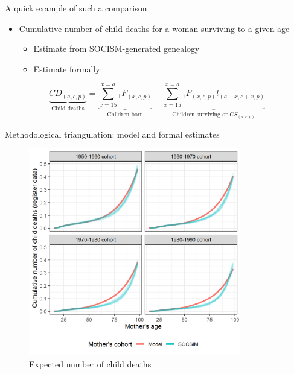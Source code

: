 \documentclass[
  ignorenonframetext,
]{beamer}
\providecommand{\tightlist}{%
  \setlength{\itemsep}{0pt}\setlength{\parskip}{0pt}}
\begin{document}
\begin{frame}{A quick example of such a comparison}
\protect\hypertarget{a-quick-example-of-such-a-comparison}{}

\begin{itemize}
\tightlist
\item
  Cumulative number of child deaths for a woman surviving to a given age

  \begin{itemize}
  \tightlist
  \item
    Estimate from SOCISM-generated genealogy
  \item
    Estimate formally:
  \end{itemize}
\end{itemize}

\begin{equation}
\underbrace{CD_{(a,c, p)}}_{\text{Child deaths}}= \underbrace{\sum_{x=15}^{x=a} {_1F_{(x,c,p)}}}_{\text{Children born}}-\underbrace{\sum_{x=15}^{x=a} {_1F_{(x,c,p)}} l_{(a-x,c+x,p)}}_{\text{Children surviving or } CS_{(a,c,p)} }
\end{equation}

\end{frame}

\begin{frame}{Methodological triangulation: model and formal estimates}
\protect\hypertarget{methodological-triangulation-model-and-formal-estimates}{}

\begin{figure}
\centering
\includegraphics[width=3.64583in,height=\textheight]{resources/child_loss_decade}
\caption{Expected number of child deaths}
\end{figure}

\end{frame}
\end{document}
